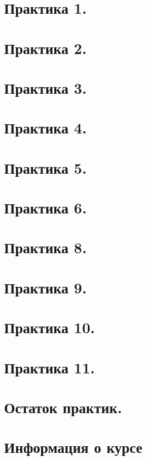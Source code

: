 \maketitle
\tableofcontents


\newpage
\section{Практика 1.}

\newpage
\section{Практика 2.}

\newpage
\section{Практика 3.}

\newpage
\section{Практика 4.}

\newpage
\section{Практика 5.}

\newpage
\section{Практика 6.}

\newpage
\section{Практика 8.}

\newpage
\section{Практика 9.}

\newpage
\section{Практика 10.}

\newpage
\section{Практика 11.}

\newpage
\section{Остаток практик.}

\newpage
\section{Информация о курсе}
